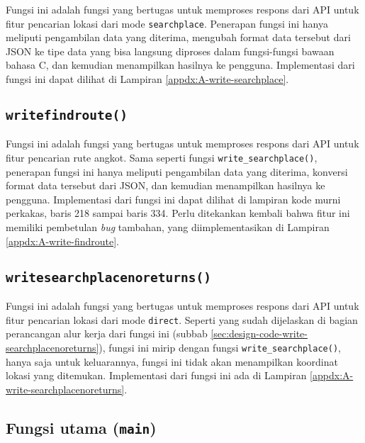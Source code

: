 Fungsi ini adalah fungsi yang bertugas untuk memproses respons dari API untuk fitur pencarian lokasi dari mode \verb|searchplace|. Penerapan fungsi ini hanya meliputi pengambilan data yang diterima, mengubah format data tersebut dari JSON ke tipe data yang bisa langsung diproses dalam fungsi-fungsi bawaan bahasa C, dan kemudian menampilkan hasilnya ke pengguna. Implementasi dari fungsi ini dapat dilihat di Lampiran \ref{appdx:A-write-searchplace}.
\newpage\vspace*{-3em} %
\subsection{\texttt{write\textunderscore findroute()}}
\label{sec:testing-implementation-write-findroute}

Fungsi ini adalah fungsi yang bertugas untuk memproses respons dari API untuk fitur pencarian rute angkot. Sama seperti fungsi \verb|write_searchplace()|, penerapan fungsi ini hanya meliputi pengambilan data yang diterima, konversi format data tersebut dari JSON, dan kemudian menampilkan hasilnya ke pengguna. Implementasi dari fungsi ini dapat dilihat di lampiran kode murni perkakas, baris 218 sampai baris 334. Perlu ditekankan kembali bahwa fitur ini memiliki pembetulan \textit{bug} tambahan, yang diimplementasikan di Lampiran \ref{appdx:A-write-findroute}.
\vspace*{-0.5em} %
\subsection{\texttt{write\textunderscore searchplace\textunderscore noreturns()}}
\label{sec:testing-implementation-write-searchplacenoreturns}

Fungsi ini adalah fungsi yang bertugas untuk memproses respons dari API untuk fitur pencarian lokasi dari mode \verb|direct|. Seperti yang sudah dijelaskan di bagian perancangan alur kerja dari fungsi ini (subbab \ref{sec:design-code-write-searchplacenoreturns}), fungsi ini mirip dengan fungsi \verb|write_searchplace()|, hanya saja untuk keluarannya, fungsi ini tidak akan menampilkan koordinat lokasi yang ditemukan. Implementasi dari  fungsi ini ada di Lampiran \ref{appdx:A-write-searchplacenoreturns}.
\vspace*{-0.5em} %
\subsection{Fungsi utama (\texttt{main})}
\label{sec:testing-implementation-main}

